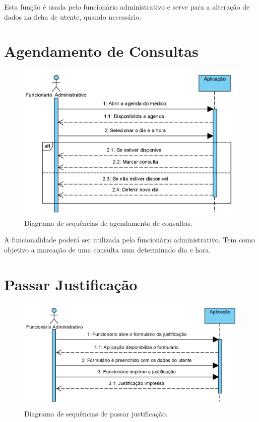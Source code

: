 \documentclass[11pt,a4paper,twoside]{report}
\begin{document}
Esta função é usada pelo funcionário administrativo e serve para a alteração de dados na ficha de utente, quando necessário.

\section{Agendamento de Consultas }


\begin{figure}[H]
	\centering
	\includegraphics[width=0.7\linewidth]{image/SequencialDiagramsImages/Agendamento_consultas}
	\caption [Diagrama de sequências de agendamento de consultas.] {Diagrama de sequências de agendamento de consultas.}
	\label{fig:agendamentoconsultasF}
\end{figure}

A funcionalidade poderá ser utilizada pelo funcionário administrativo.
Tem como objetivo a marcação de uma consulta num determinado dia e hora. 

\section{Passar Justificação}

\begin{figure}[H]
	\centering
	\includegraphics[width=0.7\linewidth]{image/SequencialDiagramsImages/Passar_justificação}
	\caption [Diagrama de sequências de passar justificação.] {Diagrama de sequências de passar justificação.}
	\label{fig:passarjustificacaoF}
\end{figure}
\end{document}
